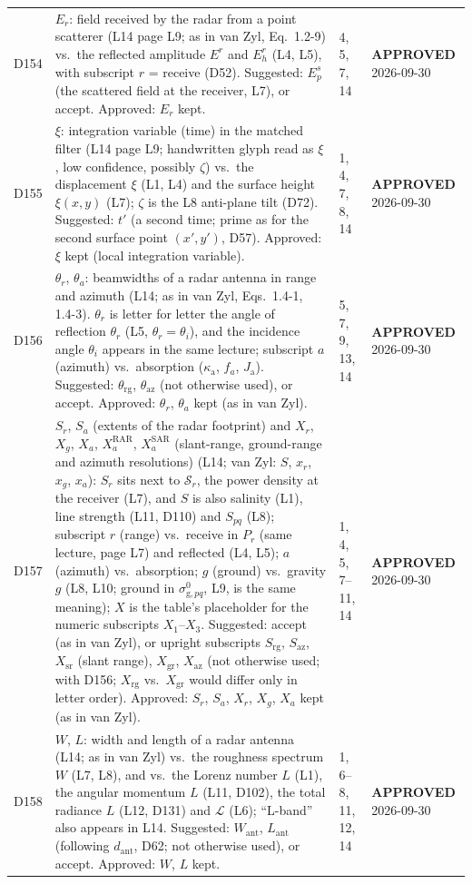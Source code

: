 \documentclass[11pt, oneside]{article}
\newcommand{\approved}{\textbf{APPROVED}}
\begin{document}
\begin{longtable}{l >{\raggedright\arraybackslash}p{} l l}
D154 & $E_r$: field received by the radar from a point scatterer (L14 page L9; as in van Zyl, Eq.~1.2-9) vs.\ the reflected amplitude $E^r$ and $E_h^r$ (L4, L5), with subscript $r$ = receive (D52). Suggested: $E_p^s$ (the scattered field at the receiver, L7), or accept. Approved: $E_r$ kept. & 4, 5, 7, 14 & \approved{} 2026-09-30 \\
D155 & $\xi$: integration variable (time) in the matched filter (L14 page L9; handwritten glyph read as $\xi$, low confidence, possibly $\zeta$) vs.\ the displacement $\xi$ (L1, L4) and the surface height $\xi(x,y)$ (L7); $\zeta$ is the L8 anti-plane tilt (D72). Suggested: $t'$ (a second time; prime as for the second surface point $(x',y')$, D57). Approved: $\xi$ kept (local integration variable). & 1, 4, 7, 8, 14 & \approved{} 2026-09-30 \\
D156 & $\theta_r$, $\theta_a$: beamwidths of a radar antenna in range and azimuth (L14; as in van Zyl, Eqs.~1.4-1, 1.4-3). $\theta_r$ is letter for letter the angle of reflection $\theta_r$ (L5, $\theta_r = \theta_i$), and the incidence angle $\theta_i$ appears in the same lecture; subscript $a$ (azimuth) vs.\ absorption ($\kappa_\mathrm{a}$, $f_a$, $J_\mathrm{a}$). Suggested: $\theta_\mathrm{rg}$, $\theta_\mathrm{az}$ (not otherwise used), or accept. Approved: $\theta_r$, $\theta_a$ kept (as in van Zyl). & 5, 7, 9, 13, 14 & \approved{} 2026-09-30 \\
D157 & $S_r$, $S_a$ (extents of the radar footprint) and $X_r$, $X_g$, $X_a$, $X_a^\mathrm{RAR}$, $X_a^\mathrm{SAR}$ (slant-range, ground-range and azimuth resolutions) (L14; van Zyl: $S$, $x_r$, $x_g$, $x_a$): $S_r$ sits next to $\mathcal{S}_r$, the power density at the receiver (L7), and $S$ is also salinity (L1), line strength (L11, D110) and $S_{pq}$ (L8); subscript $r$ (range) vs.\ receive in $P_r$ (same lecture, page L7) and reflected (L4, L5); $a$ (azimuth) vs.\ absorption; $g$ (ground) vs.\ gravity $g$ (L8, L10; ground in $\sigma^0_{\mathrm{g},pq}$, L9, is the same meaning); $X$ is the table's placeholder for the numeric subscripts $X_1$--$X_3$. Suggested: accept (as in van Zyl), or upright subscripts $S_\mathrm{rg}$, $S_\mathrm{az}$, $X_\mathrm{sr}$ (slant range), $X_\mathrm{gr}$, $X_\mathrm{az}$ (not otherwise used; with D156; $X_\mathrm{rg}$ vs.\ $X_\mathrm{gr}$ would differ only in letter order). Approved: $S_r$, $S_a$, $X_r$, $X_g$, $X_a$ kept (as in van Zyl). & 1, 4, 5, 7--11, 14 & \approved{} 2026-09-30 \\
D158 & $W$, $L$: width and length of a radar antenna (L14; as in van Zyl) vs.\ the roughness spectrum $W$ (L7, L8), and vs.\ the Lorenz number $L$ (L1), the angular momentum $L$ (L11, D102), the total radiance $L$ (L12, D131) and $\mathcal{L}$ (L6); ``L-band'' also appears in L14. Suggested: $W_\mathrm{ant}$, $L_\mathrm{ant}$ (following $d_\mathrm{ant}$, D62; not otherwise used), or accept. Approved: $W$, $L$ kept. & 1, 6--8, 11, 12, 14 & \approved{} 2026-09-30 \\

\end{longtable}
\end{document}
